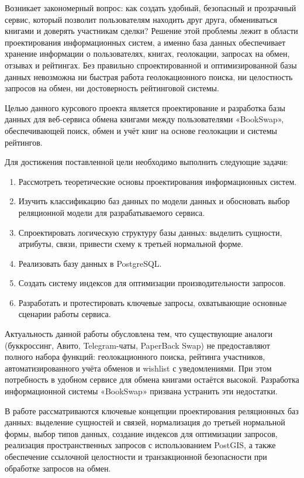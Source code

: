 \documentclass[14pt,a4paper]{extarticle}
\begin{document}
Возникает закономерный вопрос: как создать удобный, безопасный и
прозрачный сервис, который позволит пользователям находить друг друга,
обмениваться книгами и доверять участникам сделки? Решение этой проблемы
лежит в области проектирования информационных систем, а именно база
данных обеспечивает хранение информации о пользователях, книгах,
геолокации, запросах на обмен, отзывах и рейтингах. Без правильно
спроектированной и оптимизированной базы данных невозможна ни быстрая
работа геолокационного поиска, ни целостность запросов на обмен, ни
достоверность рейтинговой системы.

Целью данного курсового проекта является проектирование и разработка
базы данных для веб-сервиса обмена книгами между пользователями
«BookSwap», обеспечивающей поиск, обмен и учёт книг на основе геолокации
и системы рейтингов.

Для достижения поставленной цели необходимо выполнить следующие задачи:

\begin{enumerate}
\setlength{\itemsep}{0pt}
\setlength{\parskip}{0pt}
\def\labelenumi{\arabic{enumi}.}
\item Рассмотреть теоретические основы проектирования информационных систем.
\item Изучить классификацию баз данных по модели данных и обосновать выбор реляционной модели для разрабатываемого сервиса.
\item Спроектировать логическую структуру базы данных: выделить сущности, атрибуты, связи, привести схему к третьей нормальной форме.
\item Реализовать базу данных в PostgreSQL.
\item Создать систему индексов для оптимизации производительности запросов.
\item Разработать и протестировать ключевые запросы, охватывающие основные сценарии работы сервиса.
\end{enumerate}

Актуальность данной работы обусловлена тем, что существующие аналоги
(буккроссинг, Авито, Telegram-чаты, PaperBack Swap) не предоставляют
полного набора функций: геолокационного поиска, рейтинга участников,
автоматизированного учёта обменов и wishlist с уведомлениями. При этом
потребность в удобном сервисе для обмена книгами остаётся высокой.
Разработка информационной системы «BookSwap» призвана устранить эти
недостатки.

В работе рассматриваются ключевые концепции проектирования реляционных
баз данных: выделение сущностей и связей, нормализация до третьей
нормальной формы, выбор типов данных, создание индексов для оптимизации
запросов, реализация пространственных запросов с использованием PostGIS,
а также обеспечение ссылочной целостности и транзакционной безопасности
при обработке запросов на обмен.
\end{document}
